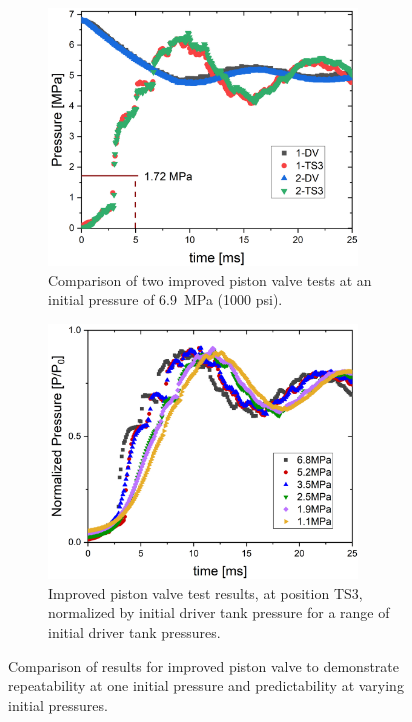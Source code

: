 \begin{figure}[bt]
    \centering
    \begin{subfigure}[t]{0.45\textwidth}
        \centering
        \includegraphics[width=0.9\textwidth]{results/plots/1000psi_FFKM_Piston_2.png}
        \caption{Comparison of two improved piston valve tests at an initial pressure of \SI{6.9}{\mega\pascal} (1000 psi).}
        \label{fig:new piston 2 test}
    \end{subfigure}
    \hfill
    \begin{subfigure}[t]{0.45\textwidth}
        \centering
        \includegraphics[width=0.9\textwidth]{results/plots/Normalized_TS3_oring.png}
        \caption{Improved piston valve test results, at position TS3, normalized by initial driver tank pressure for a range of initial driver tank pressures.}
        \label{fig:new norm}
    \end{subfigure}
    \caption{Comparison of results for improved piston valve to demonstrate repeatability at one initial pressure and predictability at varying initial pressures.}
    \label{fig:new piston repeatability}
\end{figure}







